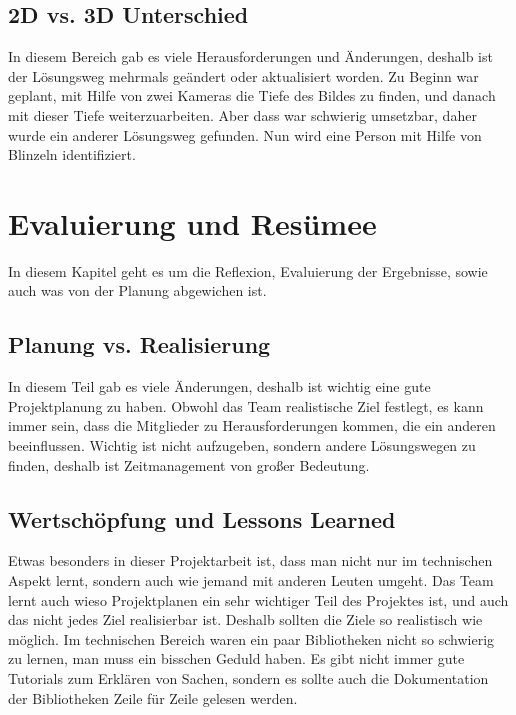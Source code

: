 \subsection{2D vs. 3D Unterschied}
In diesem Bereich gab es viele Herausforderungen und Änderungen, deshalb ist der Lösungsweg mehrmals geändert oder aktualisiert worden. Zu Beginn war geplant, mit Hilfe von zwei Kameras die Tiefe des Bildes zu finden, und danach mit dieser Tiefe weiterzuarbeiten. Aber dass war schwierig umsetzbar, daher wurde ein anderer Lösungsweg gefunden. Nun wird eine Person mit Hilfe von  Blinzeln identifiziert.
\section{Evaluierung und Resümee}
In diesem Kapitel geht es um die Reflexion, Evaluierung der Ergebnisse, sowie auch  was von der Planung abgewichen ist.
\subsection{Planung vs. Realisierung}
In diesem Teil gab es viele Änderungen, deshalb ist wichtig eine gute Projektplanung zu haben. Obwohl das Team realistische Ziel festlegt, es kann immer sein, dass die Mitglieder zu Herausforderungen kommen, die ein anderen beeinflussen. Wichtig ist nicht aufzugeben, sondern andere Lösungswegen zu finden, deshalb ist Zeitmanagement von großer Bedeutung.
\subsection{Wertschöpfung und Lessons Learned}
Etwas besonders in dieser Projektarbeit ist, dass man nicht nur im technischen Aspekt lernt, sondern auch wie jemand mit anderen Leuten umgeht. Das Team lernt auch wieso Projektplanen ein sehr wichtiger Teil des Projektes ist, und auch das nicht jedes Ziel realisierbar ist. Deshalb sollten die Ziele so realistisch wie möglich.
\bigbreak
Im technischen Bereich waren ein paar Bibliotheken nicht so schwierig zu lernen, man muss ein bisschen Geduld haben. Es gibt nicht immer gute Tutorials zum Erklären von Sachen, sondern es sollte auch die Dokumentation der Bibliotheken Zeile für Zeile gelesen werden.
